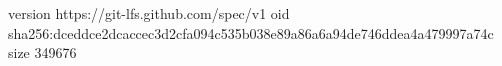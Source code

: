 version https://git-lfs.github.com/spec/v1
oid sha256:dceddce2dcaccec3d2cfa094c535b038e89a86a6a94de746ddea4a479997a74c
size 349676
